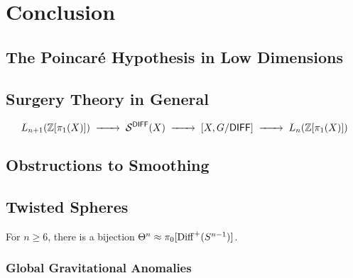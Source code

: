 \chapter{Conclusion}

\section{The Poincar\'e Hypothesis in Low Dimensions}

\section{Surgery Theory in General}

\begin{theorem}[$s$-cobordism]
\end{theorem}

\[
	L_{n+1}(\Z[\pi_1(X)]) \lkxto \mathcal{S}^\DIFF(X) \lkxto {[X, G/\DIFF]} \lkxto L_n(\Z[\pi_1(X)])
\]

\section{Obstructions to Smoothing}

\section{Twisted Spheres}\label{sec:twisted-spheres}

\begin{theorem}
  For $n\geq 6$, there is a bijection $\Theta^n \approx \pi_0[\operatorname{Diff}^+(S^{n-1})]$.
\end{theorem}

\subsection{Global Gravitational Anomalies}

\cite{witten1985anomalies}
